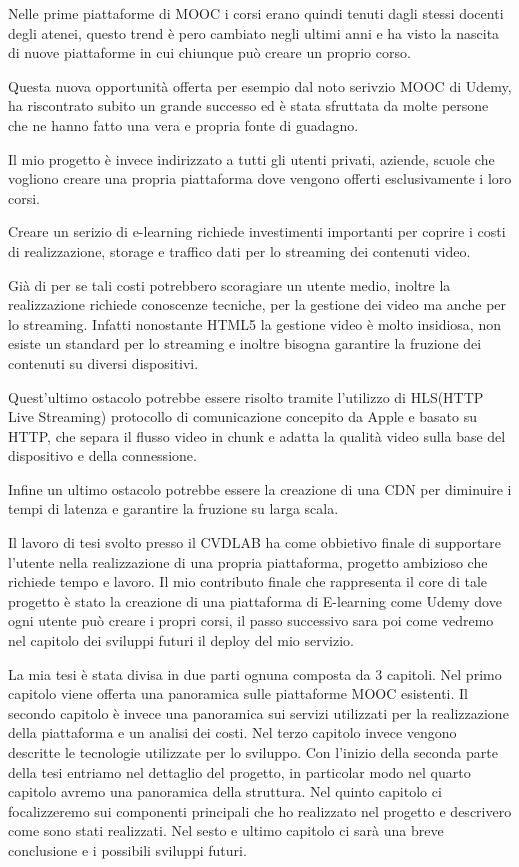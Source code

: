 Nelle prime piattaforme di MOOC i corsi erano quindi tenuti dagli stessi docenti degli atenei, questo trend è pero cambiato negli ultimi anni e ha visto la nascita di nuove piattaforme in cui chiunque può creare un proprio corso.

Questa nuova opportunità offerta per esempio dal noto serivzio MOOC di Udemy, ha riscontrato subito un grande successo ed è stata sfruttata da molte persone che ne hanno fatto una vera e propria fonte di guadagno. 

Il mio progetto è invece indirizzato a tutti gli utenti privati, aziende, scuole che vogliono creare una propria piattaforma dove vengono offerti esclusivamente i loro corsi.

Creare un serizio di e-learning richiede investimenti importanti per coprire i costi di realizzazione, storage e traffico dati per lo streaming dei contenuti video.

Già di per se tali costi potrebbero scoragiare un utente medio, inoltre la realizzazione richiede conoscenze tecniche, per la gestione dei video ma anche per lo streaming.
Infatti nonostante HTML5 la gestione video è molto insidiosa, non esiste un standard per lo streaming e inoltre bisogna garantire la fruzione dei contenuti su diversi dispositivi.

Quest'ultimo ostacolo potrebbe essere risolto tramite l'utilizzo di HLS(HTTP Live Streaming) protocollo di comunicazione concepito da Apple e basato su HTTP, che separa il flusso video in chunk e adatta la qualità video sulla base del dispositivo e della connessione.

Infine un ultimo ostacolo potrebbe essere la creazione di una CDN per diminuire i tempi di latenza e garantire la fruzione su larga scala.

Il lavoro di tesi svolto presso il CVDLAB ha come obbietivo finale di supportare l'utente nella realizzazione di una propria piattaforma, progetto ambizioso che richiede tempo e lavoro.
Il mio contributo finale che rappresenta il core di tale progetto è stato la creazione di una piattaforma di E-learning come Udemy dove ogni utente può creare i propri corsi, il passo successivo sara poi come vedremo nel capitolo dei sviluppi futuri il deploy del mio servizio.

La mia tesi è stata divisa in due parti ognuna composta da 3 capitoli.
Nel primo capitolo viene offerta una panoramica sulle piattaforme MOOC esistenti.
Il secondo capitolo è invece una panoramica sui servizi utilizzati per la realizzazione della piattaforma e un analisi dei costi.
Nel terzo capitolo invece vengono descritte le tecnologie utilizzate per lo sviluppo.
Con l'inizio della seconda parte della tesi entriamo nel dettaglio del progetto, in particolar modo nel quarto capitolo avremo una panoramica della struttura.
Nel quinto capitolo ci focalizzeremo sui componenti principali che ho realizzato nel progetto e descrivero come sono stati realizzati.
Nel sesto e ultimo capitolo ci sarà una breve conclusione e i possibili sviluppi futuri.
